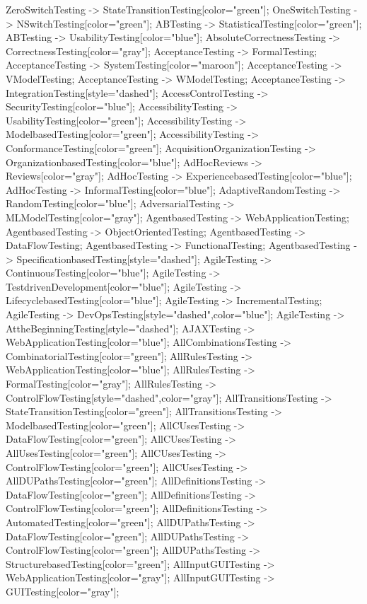\documentclass{article}
\begin{document}
{ZeroSwitchTesting -> StateTransitionTesting[color="green"];
OneSwitchTesting -> NSwitchTesting[color="green"];
ABTesting -> StatisticalTesting[color="green"];
ABTesting -> UsabilityTesting[color="blue"];
AbsoluteCorrectnessTesting -> CorrectnessTesting[color="gray"];
AcceptanceTesting -> FormalTesting;
AcceptanceTesting -> SystemTesting[color="maroon"];
AcceptanceTesting -> VModelTesting;
AcceptanceTesting -> WModelTesting;
AcceptanceTesting -> IntegrationTesting[style="dashed"];
AccessControlTesting -> SecurityTesting[color="blue"];
AccessibilityTesting -> UsabilityTesting[color="green"];
AccessibilityTesting -> ModelbasedTesting[color="green"];
AccessibilityTesting -> ConformanceTesting[color="green"];
AcquisitionOrganizationTesting -> OrganizationbasedTesting[color="blue"];
AdHocReviews -> Reviews[color="gray"];
AdHocTesting -> ExperiencebasedTesting[color="blue"];
AdHocTesting -> InformalTesting[color="blue"];
AdaptiveRandomTesting -> RandomTesting[color="blue"];
AdversarialTesting -> MLModelTesting[color="gray"];
AgentbasedTesting -> WebApplicationTesting;
AgentbasedTesting -> ObjectOrientedTesting;
AgentbasedTesting -> DataFlowTesting;
AgentbasedTesting -> FunctionalTesting;
AgentbasedTesting -> SpecificationbasedTesting[style="dashed"];
AgileTesting -> ContinuousTesting[color="blue"];
AgileTesting -> TestdrivenDevelopment[color="blue"];
AgileTesting -> LifecyclebasedTesting[color="blue"];
AgileTesting -> IncrementalTesting;
AgileTesting -> DevOpsTesting[style="dashed",color="blue"];
AgileTesting -> AttheBeginningTesting[style="dashed"];
AJAXTesting -> WebApplicationTesting[color="blue"];
AllCombinationsTesting -> CombinatorialTesting[color="green"];
AllRulesTesting -> WebApplicationTesting[color="blue"];
AllRulesTesting -> FormalTesting[color="gray"];
AllRulesTesting -> ControlFlowTesting[style="dashed",color="gray"];
AllTransitionsTesting -> StateTransitionTesting[color="green"];
AllTransitionsTesting -> ModelbasedTesting[color="green"];
AllCUsesTesting -> DataFlowTesting[color="green"];
AllCUsesTesting -> AllUsesTesting[color="green"];
AllCUsesTesting -> ControlFlowTesting[color="green"];
AllCUsesTesting -> AllDUPathsTesting[color="green"];
AllDefinitionsTesting -> DataFlowTesting[color="green"];
AllDefinitionsTesting -> ControlFlowTesting[color="green"];
AllDefinitionsTesting -> AutomatedTesting[color="green"];
AllDUPathsTesting -> DataFlowTesting[color="green"];
AllDUPathsTesting -> ControlFlowTesting[color="green"];
AllDUPathsTesting -> StructurebasedTesting[color="green"];
AllInputGUITesting -> WebApplicationTesting[color="gray"];
AllInputGUITesting -> GUITesting[color="gray"];
}
\end{document}

